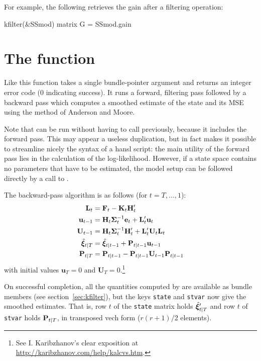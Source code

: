 \documentclass[a4paper]{article}
\begin{document}
For example, the following retrieves the gain after a filtering
operation:
%
\begin{code}
kfilter(&SSmod)
matrix G = SSmod.gain
\end{code}

\section{The  function}
\label{sec:ksmooth}

Like  this function takes a single bundle-pointer
argument and returns an integer error code (0 indicating success).  It
runs a forward, filtering pass followed by a backward pass which
computes a smoothed estimate of the state and its MSE using the method
of Anderson and Moore.

Note that  can be run without having to call
 previously, because it includes the forward pass. This
may appear a useless duplication, but in fact makes it possible to
streamline nicely the syntax of a hansl script: the main utility of
the forward pass lies in the calculation of the
log-likelihood. However, if a state space contains no 
parameters that have to be estimated, the model setup can be followed
directly by a call to .

The backward-pass algorithm is as follows (for $t=T,\dots,1$):
%
\begin{align*}
\mathbf{L}_t &= \mathbf{F}_t - \mathbf{K}_t \mathbf{H}_t' \\
\mathbf{u}_{t-1} &= \mathbf{H}_t \bm{\Sigma}_t^{-1} \mathbf{e}_t 
 + \mathbf{L}_t' \mathbf{u}_t \\
\mathbf{U}_{t-1} &= \mathbf{H}_t \bm{\Sigma}_t^{-1} \mathbf{H}_t' + 
  \mathbf{L}_t' \mathbf{U}_t \mathbf{L}_t \\
\hat{\bm{\xi}}_{t|T} &= \hat{\bm{\xi}}_{t|t-1} + 
  \mathbf{P}_{t|t-1} \mathbf{u}_{t-1} \\
\mathbf{P}_{t|T} &= \mathbf{P}_{t|t-1} - 
  \mathbf{P}_{t|t-1} \mathbf{U}_{t-1} \mathbf{P}_{t|t-1}
\end{align*}
%
with initial values $\mathbf{u}_T = 0$ and $\mathbf{U}_T =
0$.\footnote{See I. Karibzhanov's clear exposition at
\url{http://karibzhanov.com/help/kalcvs.htm}.}

On successful completion, all the quantities computed by
 are available as bundle members (see
section~\ref{sec:kfilter}), but the keys \texttt{state} and
\texttt{stvar} now give the smoothed estimates.  That is, row $t$ of
the \texttt{state} matrix holds $\hat{\bm{\xi}}_{t|T}'$ and row $t$
of \texttt{stvar} holds $\mathbf{P}_{t|T}$, in transposed vech form
($r(r+1)/2$ elements).
\end{document}
